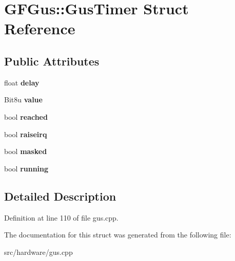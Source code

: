 \hypertarget{structGFGus_1_1GusTimer}{\section{G\-F\-Gus\-:\-:Gus\-Timer Struct Reference}
\label{structGFGus_1_1GusTimer}
}
\subsection*{Public Attributes}
\begin{DoxyCompactItemize}
\item 
\hypertarget{structGFGus_1_1GusTimer_aee952ea33d779a230a2652b5b7a0cac8}{float {\bfseries delay}}\label{structGFGus_1_1GusTimer_aee952ea33d779a230a2652b5b7a0cac8}

\item 
\hypertarget{structGFGus_1_1GusTimer_a31a1f93f014d45aef3fd61d0d5667481}{Bit8u {\bfseries value}}\label{structGFGus_1_1GusTimer_a31a1f93f014d45aef3fd61d0d5667481}

\item 
\hypertarget{structGFGus_1_1GusTimer_aef9e1ea5deb2d585b7f15eb62a89de85}{bool {\bfseries reached}}\label{structGFGus_1_1GusTimer_aef9e1ea5deb2d585b7f15eb62a89de85}

\item 
\hypertarget{structGFGus_1_1GusTimer_a4425a248a4b43b178b279f5a3e8a169c}{bool {\bfseries raiseirq}}\label{structGFGus_1_1GusTimer_a4425a248a4b43b178b279f5a3e8a169c}

\item 
\hypertarget{structGFGus_1_1GusTimer_ac033ff5008998588554e9319437e68a0}{bool {\bfseries masked}}\label{structGFGus_1_1GusTimer_ac033ff5008998588554e9319437e68a0}

\item 
\hypertarget{structGFGus_1_1GusTimer_a0cb384d64010c79f0a588b0ec81968e6}{bool {\bfseries running}}\label{structGFGus_1_1GusTimer_a0cb384d64010c79f0a588b0ec81968e6}

\end{DoxyCompactItemize}


\subsection{Detailed Description}


Definition at line 110 of file gus.\-cpp.



The documentation for this struct was generated from the following file\-:\begin{DoxyCompactItemize}
\item 
src/hardware/gus.\-cpp\end{DoxyCompactItemize}
